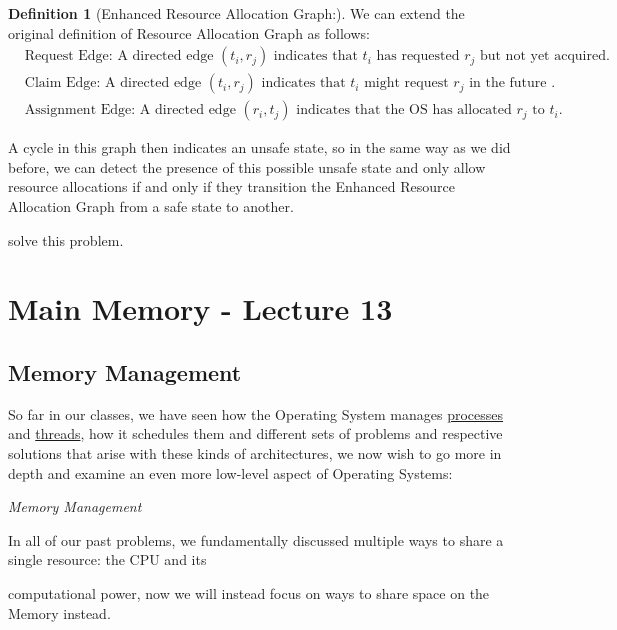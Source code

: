 \documentclass[openright, twoside]{report}
\theoremstyle{definition}
\newtheorem{definition}{Definition}[section]
\theoremstyle{example}
\begin{document}
	\begin{definition}[Enhanced Resource Allocation Graph:]
		We can extend the original definition of Resource Allocation Graph as follows:
		\begin{align*}
			&\text{Request Edge: A directed edge } (t_i, r_j) \text{ indicates that } t_i \text{ has requested } r_j \text{ but not yet acquired}.\\
			&\text{Claim Edge: A directed edge } (t_i, r_j) \text{ indicates that } t_i \text{ might request } r_j \text{ in the future }.\\
			&\text{Assignment Edge: A directed edge } (r_i, t_j) \text{ indicates that the OS has allocated } r_j \text{ to } t_i.
		\end{align*}

		A cycle in this graph then indicates an unsafe state, so in the same way as we did before, we can detect the 
		presence of this possible unsafe state and only allow resource allocations if and only if they transition 
		the Enhanced Resource Allocation Graph from a safe state to another.
		
	\end{definition}

			solve this problem.
		
\chapter{Main Memory - Lecture 13}
	\section{Memory Management}
			So far in our classes, we have seen how the Operating System manages \hyperref[ssec:proc]{processes} and \hyperref[sec:threads]{threads}, how it schedules them 
			and different sets of problems and respective solutions that arise with these kinds of architectures, we now 
			wish to go more in depth and examine an even more low-level aspect of Operating Systems:

			\begin{center}
				\emph{Memory Management}
			\end{center}

			In all of our past problems, we fundamentally discussed multiple ways to share a single resource: the CPU and its 
	
			computational power, now we will instead focus on ways to share space on the Memory instead.
\end{document}
